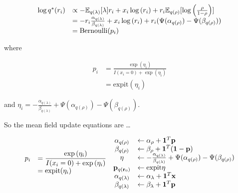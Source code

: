 \documentclass{amsart}[12pt]
\begin{document}
$$
\begin{array}{ll}
\log{q^*(r_i)} &\propto -{\mathbb E}_{q(\lambda)} [\lambda ] r_i + x_i \log{(r_i)} + r_i {\mathbb E}_{q(\rho)} [\log{\left(\frac{\rho}{1 - \rho}\right)}]\\
&= -r_i \frac{\alpha_{q(\lambda)}}{\beta_{q(\lambda)}} + x_i \log{(r_i)} + r_i (\Psi(\alpha_{q(\rho)}) - \Psi(\beta_{q(\rho)}))\\
&= \text{Bernoulli}(p_i)
\end{array}
$$

where

$$
\begin{array}{ll}
p_i &= \frac{\exp{(\eta_i)}}{I(x_i = 0) + \exp{(\eta_i)}} \\
&= \text{expit}(\eta_i)
\end{array}
$$

and $\eta_i = -\frac{\alpha_{q(\lambda)}}{\beta_{q(\lambda)}} + \Psi(\alpha_{q(\rho)}) - \Psi(\beta_{q(\rho)})$.







So the mean field update equations are \ldots

$$
\begin{array}{ll}
p_i &= \displaystyle \frac{\exp{(\eta_i)}}{I(x_i = 0) + \exp{(\eta_i)}} \\
&= \text{expit}(\eta_i)
\end{array}
\begin{array}{cl}
\alpha_{q(\rho)} &\leftarrow \alpha_\rho + {\bf 1}^T{\bf p} \\
\beta_{q(\rho)} &\leftarrow \beta_\rho + {\bf 1}^T({\bf 1} - {\bf p}) \\
\eta &\leftarrow -\frac{\alpha_{q(\lambda)}}{\beta_{q(\lambda)}} + \Psi(\alpha_{q(\rho)}) - \Psi(\beta_{q(\rho)}) \\
{\bf p}_{q({\bf r}_0)} &\leftarrow \text{expit} \eta \\
\alpha_{q(\lambda)} &\leftarrow \alpha_\lambda+ {\bf 1}^T{\bf x} \\
\beta_{q(\lambda)} &\leftarrow \beta_\lambda+ {\bf 1}^T{\bf p}
\end{array}
$$
\end{document}
